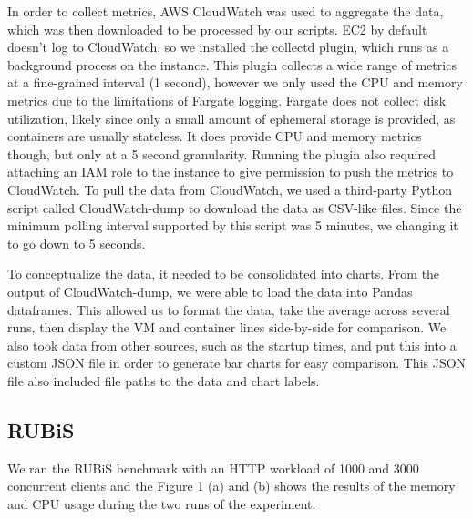 \documentclass[11pt]{article}
\begin{document}
In order to collect metrics, AWS CloudWatch was used to aggregate the data, which was then downloaded to be processed by our scripts. EC2 by default doesn't log to CloudWatch, so we installed the collectd plugin, which runs as a background process on the instance. This plugin collects a wide range of metrics at a fine-grained interval (1 second), however we only used the CPU and memory metrics due to the limitations of Fargate logging. Fargate does not collect disk utilization, likely since only a small amount of ephemeral storage is provided, as containers are usually stateless. It does provide CPU and memory metrics though, but only at a 5 second granularity. Running the plugin also required attaching an IAM role to the instance to give permission to push the metrics to CloudWatch. To pull the data from CloudWatch, we used a third-party Python script called CloudWatch-dump to download the data as CSV-like files. Since the minimum polling interval supported by this script was 5 minutes, we changing it to go down to 5 seconds.

To conceptualize the data, it needed to be consolidated into charts. From the output of CloudWatch-dump, we were able to load the data into Pandas dataframes. This allowed us to format the data, take the average across several runs, then display the VM and container lines side-by-side for comparison. We also took data from other sources, such as the startup times, and put this into a custom JSON file in order to generate bar charts for easy comparison. This JSON file also included file paths to the data and chart labels.

\subsection{RUBiS}

We ran the RUBiS benchmark with an HTTP workload of 1000 and 3000 concurrent clients and the Figure 1 (a) and (b) shows the results of the memory and CPU usage during the two runs of the experiment.
\end{document}
